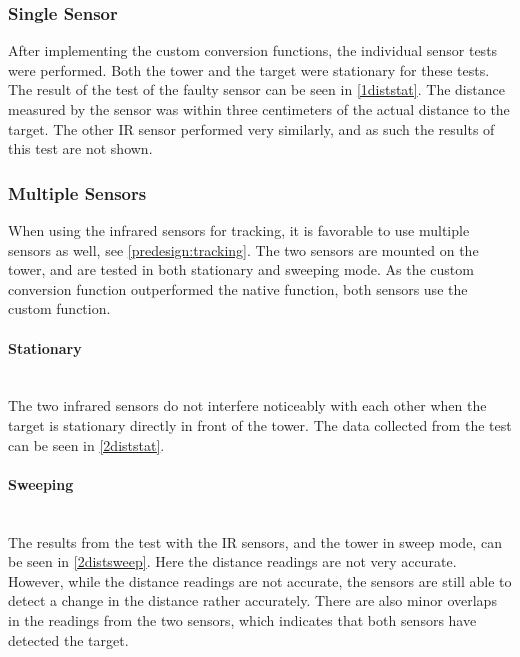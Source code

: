 \subsubsection{Single Sensor}
After implementing the custom conversion functions, the individual sensor tests were performed. Both the tower and the target were stationary for these tests. The result of the test of the faulty sensor can be seen in \cref{1diststat}. The distance measured by the sensor was within three centimeters of the actual distance to the target. The other IR sensor performed very similarly, and as such the results of this test are not shown.



\subsubsection{Multiple Sensors}
When using the infrared sensors for tracking, it is favorable to use multiple sensors as well, see \cref{predesign:tracking}. The two sensors are mounted on the tower, and are tested in both stationary and sweeping mode. As the custom conversion function outperformed the native function, both sensors use the custom function.

\paragraph{Stationary} ~\\
The two infrared sensors do not interfere noticeably with each other when the target is stationary directly in front of the tower. The data collected from the test can be seen in \cref{2diststat}. 



\paragraph{Sweeping} ~\\
The results from the test with the IR sensors, and the tower in sweep mode, can be seen in \cref{2distsweep}. Here the distance readings are not very accurate. However, while the distance readings are not accurate, the sensors are still able to detect a change in the distance rather accurately. There are also minor overlaps in the readings from the two sensors, which indicates that both sensors have detected the target. 



